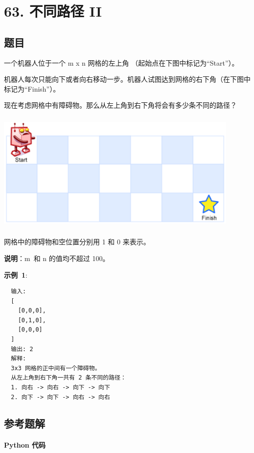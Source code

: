 \newpage
\section{63. 不同路径 II}
\label{leetcode:63}

\subsection{题目}

一个机器人位于一个 m x n 网格的左上角 （起始点在下图中标记为``Start''）。

机器人每次只能向下或者向右移动一步。机器人试图达到网格的右下角（在下图中标记为``Finish''）。

现在考虑网格中有障碍物。那么从左上角到右下角将会有多少条不同的路径？

\includegraphics[width=120mm,height=60mm]{images/leetcode/robot_maze.png}

网格中的障碍物和空位置分别用 1 和 0 来表示。

\textbf{说明}：m 和 n 的值均不超过 100。

\textbf{示例 1}:

\begin{verbatim}
  输入:
  [
    [0,0,0],
    [0,1,0],
    [0,0,0]
  ]
  输出: 2
  解释:
  3x3 网格的正中间有一个障碍物。
  从左上角到右下角一共有 2 条不同的路径：
  1. 向右 -> 向右 -> 向下 -> 向下
  2. 向下 -> 向下 -> 向右 -> 向右
\end{verbatim}

\subsection{参考题解}

\paragraph{Python 代码}

